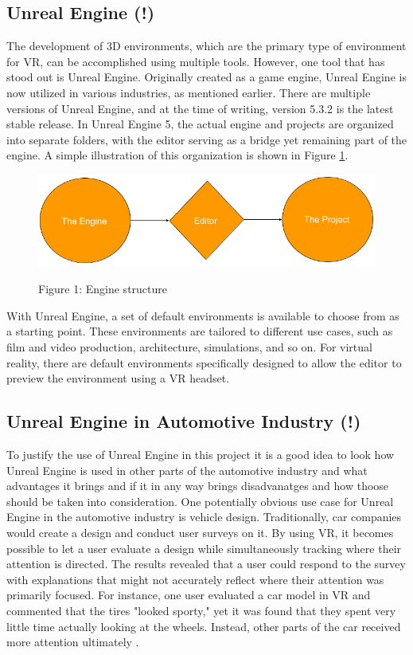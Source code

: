 \subsection{Unreal Engine (!)}
The development of 3D environments, which are the primary type of environment for VR, can be accomplished 
using multiple tools. However, one tool that has stood out is Unreal Engine. Originally created as a game 
engine, Unreal Engine is now utilized in various industries, as mentioned earlier. There are multiple 
versions of Unreal Engine, and at the time of writing, version 5.3.2 is the latest stable release. In 
Unreal Engine 5, the actual engine and projects are organized into separate folders, with the editor 
serving as a bridge yet remaining part of the engine. A simple illustration of this organization is 
shown in Figure \ref{figure 1}.
\begin{figure}
    \includegraphics[width=1.0\textwidth]{SimpleEngineToProject.png}
    \centering
    \label{figure 1}
    \caption[short]{Figure 1: Engine structure}
\end{figure}
\newline \newline
With Unreal Engine, a set of default environments is available to choose from as a starting point. 
These environments are tailored to different use cases, such as film and video production, 
architecture, simulations, and so on. For virtual reality, there are default environments 
specifically designed to allow the editor to preview the environment using a VR headset.

\subsection{Unreal Engine in Automotive Industry (!)}
To justify the use of Unreal Engine in this project it is a good idea to look how Unreal Engine is used in 
other parts of the automotive industry and what advantages it brings and if it in any way brings disadvanatges
and how thoose should be taken into consideration. 
\newline \newline
One potentially obvious use case for Unreal Engine in the automotive industry is vehicle design. Traditionally, 
car companies would create a design and conduct user surveys on it. By using VR, it becomes possible to let a 
user evaluate a design while simultaneously tracking where their attention is directed. The results revealed 
that a user could respond to the survey with explanations that might not accurately reflect where their 
attention was primarily focused. For instance, one user evaluated a car model in VR and commented that 
the tires "looked sporty," yet it was found that they spent very little time actually looking at the 
wheels. Instead, other parts of the car received more attention ultimately \cite{UnrealEngine_2022}.

